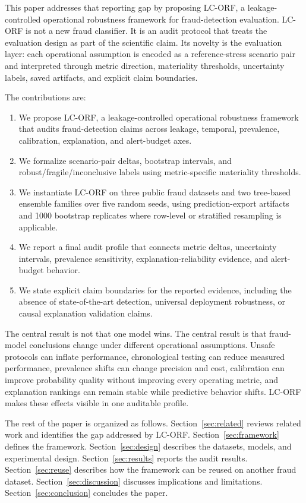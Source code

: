 \documentclass{ieeeaccess}
\begin{document}
This paper addresses that reporting gap by proposing LC-ORF, a leakage-controlled operational robustness framework for fraud-detection evaluation. LC-ORF is not a new fraud classifier. It is an audit protocol that treats the evaluation design as part of the scientific claim. Its novelty is the evaluation layer: each operational assumption is encoded as a reference-stress scenario pair and interpreted through metric direction, materiality thresholds, uncertainty labels, saved artifacts, and explicit claim boundaries.

The contributions are:
\begin{enumerate}[leftmargin=1.6em,itemsep=1pt,topsep=2pt]
\item We propose LC-ORF, a leakage-controlled operational robustness framework that audits fraud-detection claims across leakage, temporal, prevalence, calibration, explanation, and alert-budget axes.
\item We formalize scenario-pair deltas, bootstrap intervals, and robust/fragile/inconclusive labels using metric-specific materiality thresholds.
\item We instantiate LC-ORF on three public fraud datasets and two tree-based ensemble families over five random seeds, using prediction-export artifacts and 1000 bootstrap replicates where row-level or stratified resampling is applicable.
\item We report a final audit profile that connects metric deltas, uncertainty intervals, prevalence sensitivity, explanation-reliability evidence, and alert-budget behavior.
\item We state explicit claim boundaries for the reported evidence, including the absence of state-of-the-art detection, universal deployment robustness, or causal explanation validation claims.
\end{enumerate}

The central result is not that one model wins. The central result is that fraud-model conclusions change under different operational assumptions. Unsafe protocols can inflate performance, chronological testing can reduce measured performance, prevalence shifts can change precision and cost, calibration can improve probability quality without improving every operating metric, and explanation rankings can remain stable while predictive behavior shifts. LC-ORF makes these effects visible in one auditable profile.

The rest of the paper is organized as follows. Section~\ref{sec:related} reviews related work and identifies the gap addressed by LC-ORF. Section~\ref{sec:framework} defines the framework. Section~\ref{sec:design} describes the datasets, models, and experimental design. Section~\ref{sec:results} reports the audit results. Section~\ref{sec:reuse} describes how the framework can be reused on another fraud dataset. Section~\ref{sec:discussion} discusses implications and limitations. Section~\ref{sec:conclusion} concludes the paper.
\end{document}
